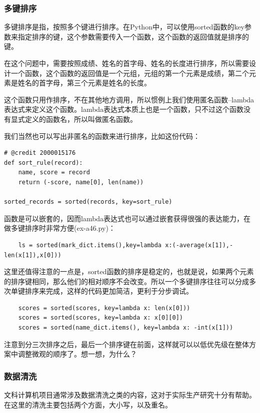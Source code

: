 \documentclass{article}
\begin{document}
\subsubsection{多键排序}

多键排序是指，按照多个键进行排序。在Python中，可以使用sorted函数的key参数来指定排序的键，这个参数需要传入一个函数，这个函数的返回值就是排序的键。

在这个问题中，需要按照成绩、姓名的首字母、姓名的长度进行排序，所以需要设计一个函数，这个函数的返回值是一个元组，元组的第一个元素是成绩，第二个元素是姓名的首字母，第三个元素是姓名的长度。

这个函数只用作排序，不在其他地方调用，所以惯例上我们使用匿名函数--lambda表达式来定义这个函数。lambda表达式本质上也是一个函数，只不过这个函数没有显式定义的函数名，所以叫做匿名函数。


我们当然也可以写出非匿名的函数来进行排序，比如这份代码：
\begin{lstlisting}
# @credit 2000015176
def sort_rule(record):
    name, score = record
    return (-score, name[0], len(name))

sorted_records = sorted(records, key=sort_rule)
\end{lstlisting}

函数是可以嵌套的，因而lambda表达式也可以通过嵌套获得很强的表达能力，在做多键排序时非常方便(ex-a46.py)：
\begin{lstlisting}
    ls = sorted(mark_dict.items(),key=lambda x:(-average(x[1]),-len(x[1]),x[0]))
\end{lstlisting}

这里还值得注意的一点是，sorted函数的排序是稳定的，也就是说，如果两个元素的排序键相同，那么他们的相对顺序不会改变。所以一个多键排序往往可以分成多次单键排序来完成，这样的代码更加简洁，更利于分步调试。

\begin{lstlisting}
    scores = sorted(scores, key=lambda x: len(x[0]))
    scores = sorted(scores, key=lambda x: x[0][0])
    scores = sorted(name_dict.items(), key=lambda x: -int(x[1]))
\end{lstlisting}

注意到分三次排序之后，最后一个排序键在前面，这样就可以以低优先级在整体方案中调整微观的顺序了。想一想，为什么？

\subsubsection{数据清洗}

文科计算机项目通常涉及数据清洗之类的内容，这对于实际生产研究十分有帮助。在这里的清洗主要包括两个方面，大小写，以及重名。
\end{document}
